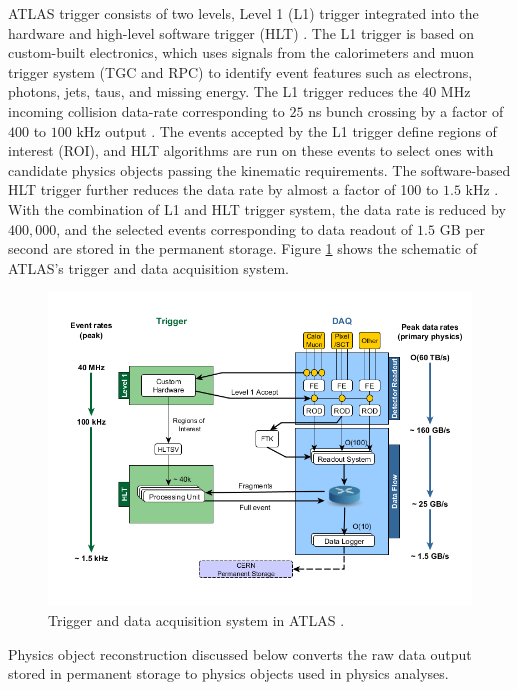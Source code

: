 ATLAS trigger consists of two levels, Level 1 (L1) trigger integrated into the hardware and high-level software trigger (HLT) \cite{TriggerSystemATLAS}. The L1 trigger is based on custom-built electronics, which uses signals from the calorimeters and muon trigger system (TGC and RPC) to identify event features such as electrons, photons, jets, taus, and missing energy. The L1 trigger reduces the $40$ MHz incoming collision data-rate corresponding to $25$ ns bunch crossing by a factor of $400$ to $100$ kHz output \cite{TriggerSystemATLAS}. The events accepted by the L1 trigger define regions of interest (ROI), and HLT algorithms are run on these events to select ones with candidate physics objects passing the kinematic requirements. The software-based HLT trigger further reduces the data rate by almost a factor of 100 to $1.5$ kHz \cite{ATLAS}. With the combination of L1 and HLT trigger system, the data rate is reduced by $400,000$, and the selected events corresponding to data readout of $1.5$ GB per second are stored in the permanent storage. Figure \ref{fig:DAQ} shows the schematic of ATLAS's trigger and data acquisition system. 

\begin{figure}
    \centering
    \includegraphics[width=.8\linewidth]{figures/LHC/DAQ_ATLAS.png}
    \caption{ Trigger and data acquisition system in ATLAS \cite{ATLAS_DAQ}.\label{fig:DAQ}}
\end{figure}

Physics object reconstruction discussed below converts the raw data output stored in permanent storage to physics objects used in physics analyses. 

